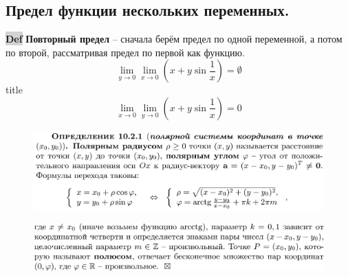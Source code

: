 \documentclass{article}
\newcommand{\bb}{\textbf}
\begin{document}
\subsection{Предел функции нескольких переменных.}
\begin{figure}[h!]
    \centering
    \vspace{-1cm}
\end{figure}
\begin{figure}[h!]
    \centering
\end{figure}

{\bfseries\colorbox{lightgray}{Def}} \bb{Повторный предел} -- сначала берём предел по одной переменной, а потом по второй, рассматривая предел по первой как функцию.
$$\lim\limits_{y\to 0}\lim\limits_{x\to 0} \left( x+y \sin\frac{1}{x} \right) = \emptyset$$title
$$\lim\limits_{x\to 0}\lim\limits_{y \to 0}\left( x + y \sin \frac{1}{x} \right) = 0 $$

\newpage
\begin{figure}[h!]
    \centering
    \includegraphics[width=\textwidth]{17.png}
    \vspace{-1cm}
\end{figure}
\begin{figure}[h!]
    \centering
    \includegraphics[width=\textwidth]{18.png}
    \vspace{-1cm}
\end{figure}
\newpage
\end{document}
